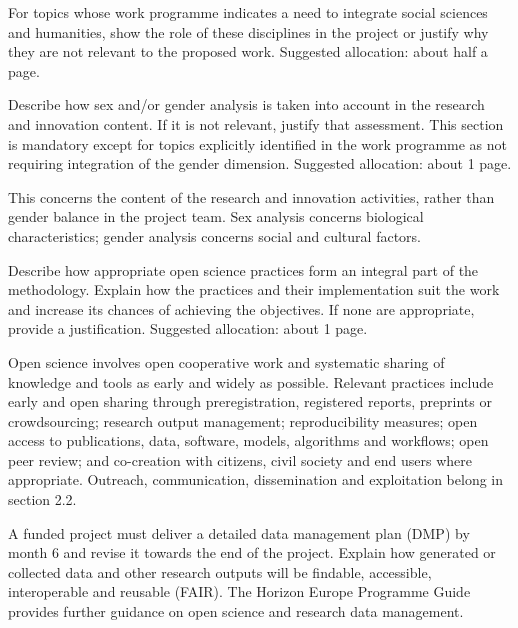 \begin{heguidance}
For topics whose work programme indicates a need to integrate social sciences
and humanities, show the role of these disciplines in the project or justify why
they are not relevant to the proposed work. Suggested allocation: about half a
page.
\end{heguidance}

\begin{heguidance}
Describe how sex and/or gender analysis is taken into account in the research
and innovation content. If it is not relevant, justify that assessment. This
section is mandatory except for topics explicitly identified in the work
programme as not requiring integration of the gender dimension. Suggested
allocation: about 1 page.

This concerns the content of the research and innovation activities, rather
than gender balance in the project team. Sex analysis concerns biological
characteristics; gender analysis concerns social and cultural factors.
\end{heguidance}

\begin{heguidance}
Describe how appropriate open science practices form an integral part of the
methodology. Explain how the practices and their implementation suit the work
and increase its chances of achieving the objectives. If none are appropriate,
provide a justification. Suggested allocation: about 1 page.

Open science involves open cooperative work and systematic sharing of knowledge
and tools as early and widely as possible. Relevant practices include early
and open sharing through preregistration, registered reports, preprints or
crowdsourcing; research output management; reproducibility measures; open access
to publications, data, software, models, algorithms and workflows; open peer
review; and co-creation with citizens, civil society and end users where
appropriate. Outreach, communication, dissemination and exploitation belong
in section 2.2.

A funded project must deliver a detailed data management plan (DMP) by month 6
and revise it towards the end of the project. Explain how generated or collected
data and other research outputs will be findable, accessible, interoperable and
reusable (FAIR). The Horizon Europe Programme Guide provides further guidance
on open science and research data management.
\end{heguidance}

